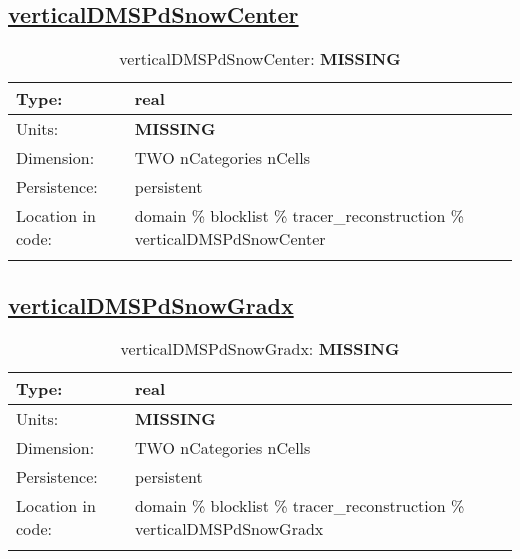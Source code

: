 \subsection[verticalDMSPdSnowCenter]{\hyperref[sec:var_tab_tracer_reconstruction]{verticalDMSPdSnowCenter}}
\label{subsec:var_sec_tracer_reconstruction_verticalDMSPdSnowCenter}
\begin{center}
\begin{longtable}{| p{2.0in} | p{4.0in} |}
        \hline 
        Type: & real \\
        \hline 
        Units: & {\bf \color{red} MISSING} \\
        \hline 
        Dimension: & TWO nCategories nCells \\
        \hline 
        Persistence: & persistent \\
        \hline 
         Location in code: & domain \% blocklist \% tracer\_reconstruction \% verticalDMSPdSnowCenter \\
         \hline 
    \caption{verticalDMSPdSnowCenter: {\bf \color{red} MISSING}}
\end{longtable}
\end{center}
\subsection[verticalDMSPdSnowGradx]{\hyperref[sec:var_tab_tracer_reconstruction]{verticalDMSPdSnowGradx}}
\label{subsec:var_sec_tracer_reconstruction_verticalDMSPdSnowGradx}
\begin{center}
\begin{longtable}{| p{2.0in} | p{4.0in} |}
        \hline 
        Type: & real \\
        \hline 
        Units: & {\bf \color{red} MISSING} \\
        \hline 
        Dimension: & TWO nCategories nCells \\
        \hline 
        Persistence: & persistent \\
        \hline 
         Location in code: & domain \% blocklist \% tracer\_reconstruction \% verticalDMSPdSnowGradx \\
         \hline 
    \caption{verticalDMSPdSnowGradx: {\bf \color{red} MISSING}}
\end{longtable}
\end{center}
